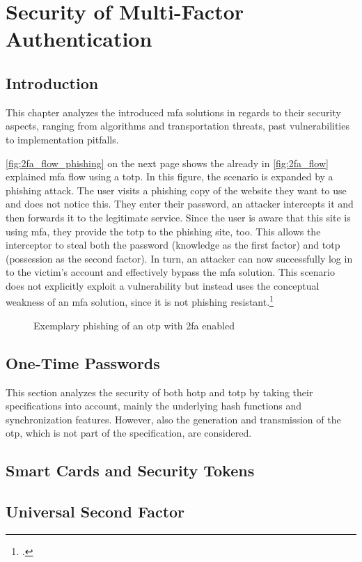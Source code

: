 \chapter{Security of Multi-Factor Authentication}

\section{Introduction}

This chapter analyzes the introduced \gls{mfa} solutions in regards to their security aspects, ranging from algorithms and transportation threats, past vulnerabilities to implementation pitfalls.

\autoref{fig:2fa_flow_phishing} on the next page shows the already in \autoref{fig:2fa_flow} explained \gls{mfa} flow using a \gls{totp}. In this figure, the scenario is expanded by a phishing attack. The user visits a phishing copy of the website they want to use and does not notice this. They enter their password, an attacker intercepts it and then forwards it to the legitimate service. Since the user is aware that this site is using \gls{mfa}, they provide the \gls{totp} to the phishing site, too. This allows the interceptor to steal both the password (knowledge as the first factor) and \gls{totp} (possession as the second factor). In turn, an attacker can now successfully log in to the victim's account and effectively bypass the \gls{mfa} solution. This scenario does not explicitly exploit a vulnerability but instead uses the conceptual weakness of an \gls{mfa} solution, since it is not phishing resistant.\footcites[See][61]{Ulqinaku:2019:FPP:3317549.3323404}

\newpage

\begin{figure}[hbt]
	\centering
	
	\caption[Exemplary phishing of an \gls{otp} with \gls{2fa} enabled]{Exemplary phishing of an \gls{otp} with \gls{2fa} enabled\footnotemark}
	\label{fig:2fa_flow_phishing}
\end{figure}

\section{One-Time Passwords}
\label{sec:totp_sec}

This section analyzes the security of both \gls{hotp} and \gls{totp} by taking their specifications into account, mainly the underlying hash functions and synchronization features. However, also the generation and transmission of the \gls{otp}, which is not part of the specification, are considered.



\section{Smart Cards and Security Tokens}
\label{sec:tokens}



\section{Universal Second Factor}
\label{sec:u2f}



